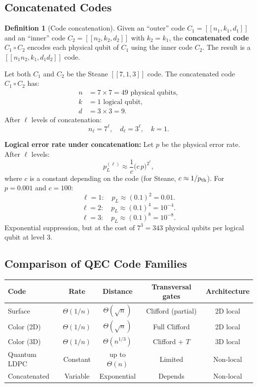 \documentclass[11pt, a4paper]{article}
\theoremstyle{definition}
\newtheorem{definition}{Definition}[section]
\theoremstyle{plain}
\theoremstyle{remark}
\newcommand{\code}[1]{[\![#1]\!]}
\begin{document}
\subsection{Concatenated Codes}

\begin{definition}[Code concatenation]
Given an ``outer'' code $C_1 = \code{n_1, k_1, d_1}$ and an ``inner'' code
$C_2 = \code{n_2, k_2, d_2}$ with $k_2 = k_1$, the
\textbf{concatenated code} $C_1 \circ C_2$ encodes each physical qubit
of $C_1$ using the inner code $C_2$.  The result is a
$\code{n_1 n_2, k_1, d_1 d_2}$ code.
\end{definition}

\begin{workedexample}
Let both $C_1$ and $C_2$ be the Steane $\code{7,1,3}$ code.
The concatenated code $C_1 \circ C_2$ has:
\begin{align*}
  n &= 7 \times 7 = 49 \text{ physical qubits},\\
  k &= 1 \text{ logical qubit},\\
  d &= 3 \times 3 = 9.
\end{align*}
After $\ell$ levels of concatenation:
\[
  n_\ell = 7^\ell, \quad d_\ell = 3^\ell, \quad k = 1.
\]

\textbf{Logical error rate under concatenation:}
Let $p$ be the physical error rate.  After $\ell$ levels:
\[
  p_L^{(\ell)} \approx \frac{1}{c}\bigl(c\,p\bigr)^{2^\ell},
\]
where $c$ is a constant depending on the code (for Steane, $c \approx 1/p_{\rm th}$).
For $p = 0.001$ and $c = 100$:
\[
  \ell=1: \quad p_L \approx (0.1)^2 = 0.01.
\]
\[
  \ell=2: \quad p_L \approx (0.1)^4 = 10^{-4}.
\]
\[
  \ell=3: \quad p_L \approx (0.1)^8 = 10^{-8}.
\]
Exponential suppression, but at the cost of $7^3 = 343$ physical qubits per
logical qubit at level 3.
\end{workedexample}

\subsection{Comparison of QEC Code Families}

\begin{center}
\renewcommand{\arraystretch}{1.4}
\begin{tabular}{@{} l c c c c @{}}
  \toprule
  \textbf{Code} & \textbf{Rate} & \textbf{Distance} &
    \textbf{Transversal gates} & \textbf{Architecture}\\
  \midrule
  Surface & $\Theta(1/n)$ & $\Theta(\sqrt{n})$ & Clifford (partial) & 2D local\\
  Color (2D) & $\Theta(1/n)$ & $\Theta(\sqrt{n})$ & Full Clifford & 2D local\\
  Color (3D) & $\Theta(1/n)$ & $\Theta(n^{1/3})$ & Clifford + $T$ & 3D local\\
  Quantum LDPC & Constant & up to $\Theta(n)$ & Limited & Non-local\\
  Concatenated & Variable & Exponential & Depends & Non-local\\
  \bottomrule
\end{tabular}
\end{center}
\end{document}
